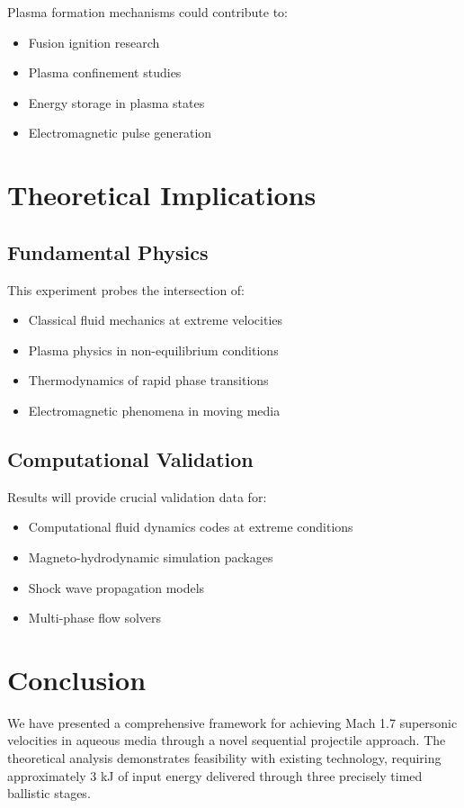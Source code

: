 \documentclass[12pt,a4paper]{article}
\begin{document}
Plasma formation mechanisms could contribute to:
\begin{itemize}
\item Fusion ignition research
\item Plasma confinement studies
\item Energy storage in plasma states
\item Electromagnetic pulse generation
\end{itemize}

\section{Theoretical Implications}

\subsection{Fundamental Physics}

This experiment probes the intersection of:
\begin{itemize}
\item Classical fluid mechanics at extreme velocities
\item Plasma physics in non-equilibrium conditions
\item Thermodynamics of rapid phase transitions
\item Electromagnetic phenomena in moving media
\end{itemize}

\subsection{Computational Validation}

Results will provide crucial validation data for:
\begin{itemize}
\item Computational fluid dynamics codes at extreme conditions
\item Magneto-hydrodynamic simulation packages
\item Shock wave propagation models
\item Multi-phase flow solvers
\end{itemize}

\section{Conclusion}

We have presented a comprehensive framework for achieving Mach 1.7 supersonic velocities in aqueous media through a novel sequential projectile approach. The theoretical analysis demonstrates feasibility with existing technology, requiring approximately 3 kJ of input energy delivered through three precisely timed ballistic stages.
\end{document}
